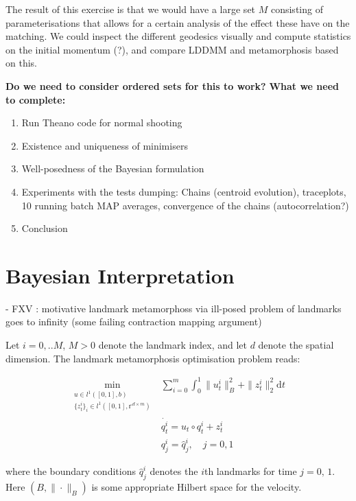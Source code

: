 \documentclass{article}
\newcommand{\norm}[2]{\| #1 \|_{ #2 }}
\newcommand{\bnorm}[1]{\norm{ #1 }{B}}
\newcommand{\ltwonorm}[1]{\norm{ #1 }{2}}
\newcommand{\diff}[1]{\text{d} #1}
\begin{document}
The result of this exercise is that we would have a large set $M$ consisting of
parameterisations that allows for a certain analysis of the effect these have on
the matching. We could inspect the different geodesics visually and compute
statistics on the initial momentum (?), and compare LDDMM and metamorphosis
based on this.

\textbf{Do we need to consider ordered sets for this to work?}
\textbf{What we need to complete:}

\begin{enumerate}
\item Run Theano code for normal shooting
\item Existence and uniqueness of minimisers
\item Well-posedness of the Bayesian formulation
\item Experiments with the tests dumping: Chains (centroid evolution),
traceplots, 10 running batch MAP averages, convergence of the chains
(autocorrelation?)
\item Conclusion
\end{enumerate}


\section{Bayesian Interpretation}

- FXV : motivative landmark metamorphoss via ill-posed problem of landmarks goes
to infinity (some failing contraction mapping argument)

Let $i=0,..M$, $M>0$ denote the landmark index, and let $d$ denote the spatial
dimension. The landmark metamorphosis optimisation problem reads:

\begin{subequations}\label{pbl:landmark_mm}
\begin{align}
\min_{\substack{u\in l^1([0,1],b)\\ \{z^i_t\}_i \in l^1([0,1],\mathbb{r}^{d\times m})}} &
\sum_{i=0}^m \int_0^1 \bnorm{u^i_t}^2 + \ltwonorm{z^i_t}^2 \diff{t}\\
            & \dot{q^i_t} = u_t \circ q^i_t + z^i_t \label{eq:ele_q} \\
            & q^i_j = \hat q^i_j, \quad j=0,1 \label{eq:ele_q_bcs}
\end{align}
\end{subequations}

where the boundary conditions $\hat q^i_j$ denotes the $i$th landmarks for time
$j=0,\,1$. Here $(B,\bnorm{\cdot})$ is some appropriate Hilbert space for the
velocity.
\end{document}
